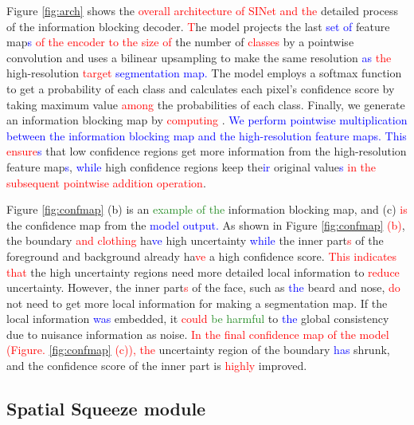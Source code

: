 \documentclass[10pt,twocolumn,letterpaper]{article}
\newcommand\Lars[1]{\textcolor{blue}{#1}}
\newcommand\yj[1]{\textcolor{ForestGreen}{#1}}
\newcommand\nj[1]{\textcolor{red}{#1}}
\newcommand\Lars[1]{#1}
\newcommand\yj[1]{#1}
\newcommand\nj[1]{#1}
\begin{document}
Figure \ref{fig:arch} shows the \nj{overall architecture of SINet and the} detailed process of the information blocking decoder. 
\nj{T}he model projects the last \Lars{set of} feature map\Lars{s} \nj{of the encoder to the size of} the number of \nj{classes} by a pointwise convolution and uses a bilinear upsampling to make the same resolution \Lars{as} \nj{the} high-resolution \nj{target} \Lars{segmentation map. }The model employs a softmax function to get a probability of each class and calculates each pixel's confidence score \nj{} by taking maximum value \nj{among} the probabilities of each class.
Finally, we generate an information blocking map by \nj{computing} . \Lars{We perform pointwise multiplication between the information blocking map and the high-resolution feature maps. This \nj{ensure\Lars{s}}} that low confidence regions get more information from the high-resolution feature map\Lars{s}, \Lars{while} high confidence regions keep the\Lars{ir} original value\Lars{s} \nj{in the subsequent pointwise addition operation}.

Figure \ref{fig:confmap} (b) is an \yj{example of the} information blocking map, and (c) \nj{is} the confidence map from the \Lars{model output. }As shown in Figure \ref{fig:confmap} \nj{(b)}, the boundary \nj{and clothing} ha\Lars{ve} high uncertainty \Lars{while} the inner part\nj{s} of the foreground and background already ha\nj{ve} a high confidence score.
\nj{This indicates that} the high uncertainty regions need more detailed local information to \nj{reduce} uncertainty.
However, the inner part\nj{s} of the face, such as \Lars{the} beard and nose, \nj{do} not need to get more local information for making a segmentation map.
If the local information \Lars{was} embedded, it \yj{\nj{could} be harmful} to \Lars{the} global consistency due to nuisance information as noise.
\nj{In the final confidence map of the model (Figure. \ref{fig:confmap} (c)), 
the} uncertainty region of the boundary \Lars{has} shrunk, and the confidence score of the inner part is \nj{highly} improved.















\subsection{Spatial Squeeze module}
\label{S2}
\end{document}
